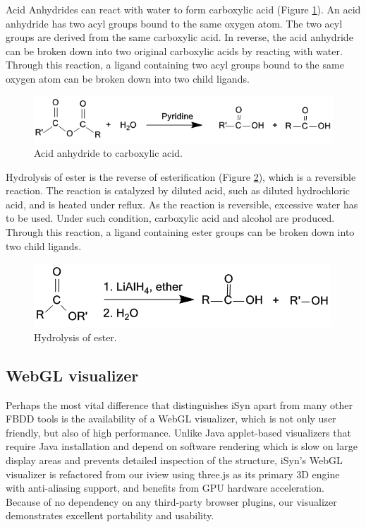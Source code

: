 Acid Anhydrides can react with water to form carboxylic acid (Figure \ref{fig:AcidAnhydride}). An acid anhydride has two acyl groups bound to the same oxygen atom. The two acyl groups are derived from the same carboxylic acid. In reverse, the acid anhydride can be broken down into two original carboxylic acids by reacting with water. Through this reaction, a ligand containing two acyl groups bound to the same oxygen atom can be broken down into two child ligands.
 
\begin{figure}
\begin{center}
\includegraphics[width=\linewidth]{../isyn/AcidAnhydride.png}
\end{center}
\caption{Acid anhydride to carboxylic acid.}
\label{fig:AcidAnhydride}
\end{figure}

Hydrolysis of ester is the reverse of esterification (Figure \ref{fig:EsterHydrolysis}), which is a reversible reaction. The reaction is catalyzed by diluted acid, such as diluted hydrochloric acid, and is heated under reflux. As the reaction is reversible, excessive water has to be used. Under such condition, carboxylic acid and alcohol are produced. Through this reaction, a ligand containing ester groups can be broken down into two child ligands.

\begin{figure}
\begin{center}
\includegraphics[width=\linewidth]{../isyn/EsterHydrolysis.png}
\end{center}
\caption{Hydrolysis of ester.}
\label{fig:EsterHydrolysis}
\end{figure}

\subsection{WebGL visualizer}

Perhaps the most vital difference that distinguishes iSyn apart from many other FBDD tools is the availability of a WebGL visualizer, which is not only user friendly, but also of high performance. Unlike Java applet-based visualizers that require Java installation and depend on software rendering which is slow on large display areas and prevents detailed inspection of the structure, iSyn’s WebGL visualizer is refactored from our iview \citep{1366} using three.js as its primary 3D engine with anti-aliasing support, and benefits from GPU hardware acceleration. Because of no dependency on any third-party browser plugins, our visualizer demonstrates excellent portability and usability.

